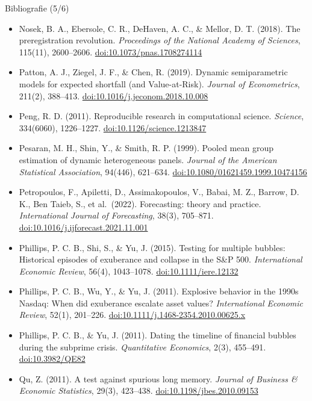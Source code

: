 \begin{frame}{Bibliografie (5/6)}
\itemsize{\tiny}
\begin{itemize}
    \item Nosek, B. A., Ebersole, C. R., DeHaven, A. C., \& Mellor, D. T. (2018). The preregistration revolution. \textit{Proceedings of the National Academy of Sciences}, 115(11), 2600--2606. \href{https://doi.org/10.1073/pnas.1708274114}{doi:10.1073/pnas.1708274114}
    \item Patton, A. J., Ziegel, J. F., \& Chen, R. (2019). Dynamic semiparametric models for expected shortfall (and Value-at-Risk). \textit{Journal of Econometrics}, 211(2), 388--413. \href{https://doi.org/10.1016/j.jeconom.2018.10.008}{doi:10.1016/j.jeconom.2018.10.008}
    \item Peng, R. D. (2011). Reproducible research in computational science. \textit{Science}, 334(6060), 1226--1227. \href{https://doi.org/10.1126/science.1213847}{doi:10.1126/science.1213847}
    \item Pesaran, M. H., Shin, Y., \& Smith, R. P. (1999). Pooled mean group estimation of dynamic heterogeneous panels. \textit{Journal of the American Statistical Association}, 94(446), 621--634. \href{https://doi.org/10.1080/01621459.1999.10474156}{doi:10.1080/01621459.1999.10474156}
    \item Petropoulos, F., Apiletti, D., Assimakopoulos, V., Babai, M. Z., Barrow, D. K., Ben Taieb, S., et al.\ (2022). Forecasting: theory and practice. \textit{International Journal of Forecasting}, 38(3), 705--871. \href{https://doi.org/10.1016/j.ijforecast.2021.11.001}{doi:10.1016/j.ijforecast.2021.11.001}
    \item Phillips, P. C. B., Shi, S., \& Yu, J. (2015). Testing for multiple bubbles: Historical episodes of exuberance and collapse in the S\&P 500. \textit{International Economic Review}, 56(4), 1043--1078. \href{https://doi.org/10.1111/iere.12132}{doi:10.1111/iere.12132}
    \item Phillips, P. C. B., Wu, Y., \& Yu, J. (2011). Explosive behavior in the 1990s Nasdaq: When did exuberance escalate asset values? \textit{International Economic Review}, 52(1), 201--226. \href{https://doi.org/10.1111/j.1468-2354.2010.00625.x}{doi:10.1111/j.1468-2354.2010.00625.x}
    \item Phillips, P. C. B., \& Yu, J. (2011). Dating the timeline of financial bubbles during the subprime crisis. \textit{Quantitative Economics}, 2(3), 455--491. \href{https://doi.org/10.3982/QE82}{doi:10.3982/QE82}
    \item Qu, Z. (2011). A test against spurious long memory. \textit{Journal of Business \& Economic Statistics}, 29(3), 423--438. \href{https://doi.org/10.1198/jbes.2010.09153}{doi:10.1198/jbes.2010.09153}

\end{itemize}
\end{frame}
